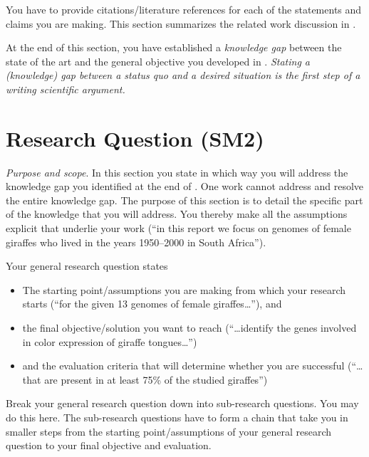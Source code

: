 \documentclass[../thesis-example-en]{subfiles}
\begin{document}
You have to provide citations/literature references for each of the statements and claims you are making.
This section summarizes the related work discussion in .

At the end of this section, you have established a \emph{knowledge gap} between the state of the art and the general objective you developed in .
\emph{Stating a (knowledge) gap between a status quo and a desired situation is the \emph{first step} of a writing scientific argument.}

\section{Research Question (SM2)}\label{sec:introduction:research-question}

\emph{Purpose and scope}.
In this section you state in which way you will address the knowledge gap you identified at the end of .
One work cannot address and resolve the entire knowledge gap.
The purpose of this section is to detail the specific part of the knowledge that you will address.
You thereby make all the assumptions explicit that underlie your work (``in this report we focus on genomes of female giraffes who lived in the years 1950--2000 in South Africa'').

Your general research question states
\begin{itemize}
  \item The starting point/assumptions you are making from which your research starts (``for the given 13 genomes of female giraffes\ldots''), and
  \item the final objective/solution you want to reach (``\ldots{}identify the genes involved in color expression of giraffe tongues\ldots'')
  \item and the evaluation criteria that will determine whether you are successful (``\ldots{}that are present in at least 75\% of the studied giraffes'')
\end{itemize}

Break your general research question down into sub-research questions.
You may do this here.
The sub-research questions have to form a chain that take you in smaller steps from the starting point/assumptions of your general research question to your final objective and evaluation.
\end{document}
